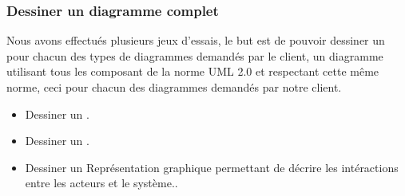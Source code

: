 \documentclass[12pt,a4paper,openany]{report}
\begin{document}
		\subsubsection{Dessiner un diagramme complet}
		Nous avons effectués plusieurs jeux d'essais, le but est de pouvoir dessiner un pour chacun des types de diagrammes demandés par le client,
		un diagramme utilisant tous les composant de la norme UML 2.0 et respectant cette même norme, ceci pour chacun des diagrammes 
		demandés par notre client. 
		\begin{itemize}
			\item Dessiner un .
			\item Dessiner un .
			\item Dessiner un  {Représentation graphique permettant de décrire les intéractions entre les acteurs et le système.}.
		\end{itemize}
	
\end{document}
